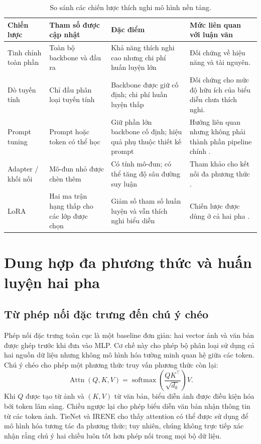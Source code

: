 \begin{table}[htbp]
\centering
\small
\renewcommand{\arraystretch}{1.2}
\begin{tabularx}{\textwidth}{L{2.5cm} L{3.0cm} X X}
\toprule
\textbf{Chiến lược} & \textbf{Tham số được cập nhật} & \textbf{Đặc điểm} & \textbf{Mức liên quan với luận văn} \\
\midrule
Tinh chỉnh toàn phần & Toàn bộ backbone và đầu ra & Khả năng thích nghi cao nhưng chi phí huấn luyện lớn & Đối chứng về hiệu năng và tài nguyên. \\
\addlinespace
Dò tuyến tính & Chỉ đầu phân loại tuyến tính & Backbone được giữ cố định; chi phí huấn luyện thấp & Đối chứng cho mức độ hữu ích của biểu diễn chưa thích nghi. \\
\addlinespace
Prompt tuning & Prompt hoặc token có thể học & Giữ phần lớn backbone cố định; hiệu quả phụ thuộc thiết kế prompt & Hướng liên quan nhưng không phải thành phần pipeline chính \cite{PLIP,BiomedCoOp,FPT}. \\
\addlinespace
Adapter / khối nối & Mô-đun nhỏ được chèn thêm & Có tính mô-đun; có thể tăng độ sâu đường suy luận & Tham khảo cho kết nối đa phương thức \cite{FTB}. \\
\addlinespace
LoRA & Hai ma trận hạng thấp cho các lớp được chọn & Giảm số tham số huấn luyện và vẫn thích nghi biểu diễn & Chiến lược được dùng ở cả hai pha \cite{Hu2022LoRA,LCBB}. \\
\bottomrule
\end{tabularx}
\caption{So sánh các chiến lược thích nghi mô hình nền tảng.}
\label{tab:ch2_peft}
\end{table}

\section{Dung hợp đa phương thức và huấn luyện hai pha}

\subsection{Từ phép nối đặc trưng đến chú ý chéo}

Phép nối đặc trưng toàn cục là một baseline đơn giản: hai vector ảnh và văn bản được ghép trước khi đưa vào MLP. Cơ chế này cho phép bộ phân loại sử dụng cả hai nguồn dữ liệu nhưng không mô hình hóa tường minh quan hệ giữa các token. Chú ý chéo cho phép một phương thức truy vấn phương thức còn lại:
\begin{equation}
    \operatorname{Attn}(Q,K,V)
    = \operatorname{softmax}\!\left(\frac{QK^{\top}}{\sqrt{d_k}}\right)V.
\end{equation}
Khi $Q$ được tạo từ ảnh và $(K,V)$ từ văn bản, biểu diễn ảnh được điều kiện hóa bởi token lâm sàng. Chiều ngược lại cho phép biểu diễn văn bản nhận thông tin từ các token ảnh. TieNet \cite{TieNet} và IRENE \cite{IRENE} cho thấy attention có thể được sử dụng để mô hình hóa tương tác đa phương thức; tuy nhiên, chúng không trực tiếp xác nhận rằng chú ý hai chiều luôn tốt hơn phép nối trong mọi bộ dữ liệu.

